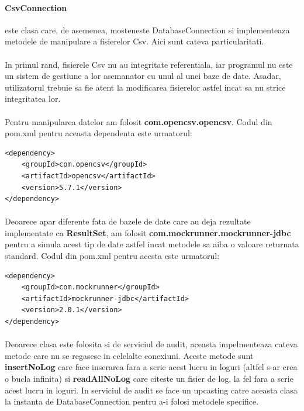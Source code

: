 \documentclass[oneside]{article}
\begin{document}
\paragraph{CsvConnection} este clasa care, de asemenea, mosteneste DatabaseConnection si implementeaza metodele de manipulare a fisierelor Csv. Aici sunt cateva particularitati.

\paragraph{} In primul rand, fisierele Csv nu au integritate referentiala, iar programul nu este un sistem de gestiune a lor asemanator cu unul al unei baze de date. Asadar, utilizatorul trebuie sa fie atent la modificarea fisierelor astfel incat sa nu strice integritatea lor.

\paragraph{} Pentru manipularea datelor am folosit \textbf{com.opencsv.opencsv}. Codul din pom.xml pentru aceasta dependenta este urmatorul:

\begin{center}
    \begin{lstlisting}
<dependency>
    <groupId>com.opencsv</groupId>
    <artifactId>opencsv</artifactId>
    <version>5.7.1</version>
</dependency>
    \end{lstlisting}
\end{center}

\paragraph{} Deoarece apar diferente fata de bazele de date care au deja rezultate implementate ca \textbf{ResultSet}, am folosit \textbf{com.mockrunner.mockrunner-jdbc} pentru a simula acest tip de date astfel incat metodele sa aiba o valoare returnata standard. Codul din pom.xml pentru acesta este urmatorul:

\begin{center}
    \begin{lstlisting}
<dependency>
    <groupId>com.mockrunner</groupId>
    <artifactId>mockrunner-jdbc</artifactId>
    <version>2.0.1</version>
</dependency>
    \end{lstlisting}
\end{center}

\paragraph{} Deoarece clasa este folosita si de serviciul de audit, aceasta impelmenteaza cateva metode care nu se regasesc in celelalte conexiuni. Aceste metode sunt \textbf{insertNoLog} care face inserarea fara a scrie acest lucru in loguri (altfel s-ar crea o bucla infinita) si \textbf{readAllNoLog} care citeste un fisier de log, la fel fara a scrie acest lucru in loguri. In serviciul de audit se face un upcasting catre aceasta clasa la instanta de DatabaseConnection pentru a-i folosi metodele specifice.
\end{document}

